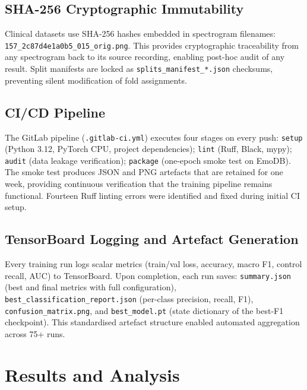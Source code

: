 \documentclass[oneside,openany]{final_report}
\begin{document}
\section{SHA-256 Cryptographic Immutability}

Clinical datasets use SHA-256 hashes embedded in spectrogram filenames: \texttt{157\_2c87d4e1a0b5\_015\_orig.png}. This provides cryptographic traceability from any spectrogram back to its source recording, enabling post-hoc audit of any result. Split manifests are locked as \texttt{splits\_manifest\_*.json} checksums, preventing silent modification of fold assignments.

\section{CI/CD Pipeline}

The GitLab pipeline (\texttt{.gitlab-ci.yml}) executes four stages on every push: \texttt{setup} (Python 3.12, PyTorch CPU, project dependencies); \texttt{lint} (Ruff, Black, mypy); \texttt{audit} (data leakage verification); \texttt{package} (one-epoch smoke test on EmoDB). The smoke test produces JSON and PNG artefacts that are retained for one week, providing continuous verification that the training pipeline remains functional. Fourteen Ruff linting errors were identified and fixed during initial CI setup.

\section{TensorBoard Logging and Artefact Generation}

Every training run logs scalar metrics (train/val loss, accuracy, macro F1, control recall, AUC) to TensorBoard. Upon completion, each run saves: \texttt{summary.json} (best and final metrics with full configuration), \texttt{best\_classification\_report.json} (per-class precision, recall, F1), \texttt{confusion\_matrix.png}, and \texttt{best\_model.pt} (state dictionary of the best-F1 checkpoint). This standardised artefact structure enabled automated aggregation across 75+ runs.

\chapter{Results and Analysis}
\end{document}
